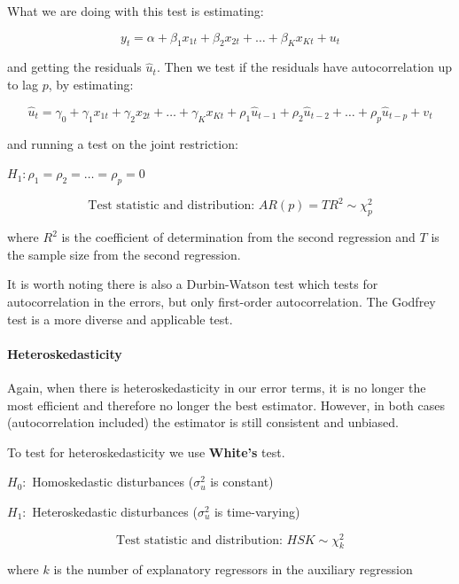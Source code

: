 \documentclass[11pt]{article}
\begin{document}
What we are doing with this test is estimating:

\begin{equation}
y_t=\alpha+\beta_1 x_{1 t}+\beta_2 x_{2 t}+\ldots+\beta_K x_{K t}+u_t
\end{equation}

and getting the residuals $\hat{u}_t$. Then we test if the residuals have autocorrelation up to lag $p$, by estimating:

\begin{equation}
\hat{u}_t=\gamma_0+\gamma_1 x_{1 t}+\gamma_2 x_{2 t}+\ldots+\gamma_K x_{K t}+\rho_1 \hat{u}_{t-1}+\rho_2 \hat{u}_{t-2}+\ldots+\rho_p \hat{u}_{t-p}+v_t
\end{equation}

and running a test on the joint restriction:

$H_1: \rho_1=\rho_2=\ldots=\rho_p=0$

\[\text{Test statistic and distribution: } AR(p) = TR^2 \sim \chi_p^2\]

where $R^2$ is the coefficient of determination from the second regression and $T$ is the sample size from the second regression.

It is worth noting there is also a Durbin-Watson test which tests for autocorrelation in the errors, but only first-order autocorrelation. The Godfrey test is a more diverse and applicable test.

\paragraph{Heteroskedasticity} \mbox{}

Again, when there is heteroskedasticity in our error terms, it is no longer the most efficient and therefore no longer the best estimator. However, in both cases (autocorrelation included) the estimator is still consistent and unbiased.

To test for heteroskedasticity we use \textbf{White's} test.

\begin{mdframed}
    $H_0:$ Homoskedastic disturbances ($\sigma_u^2$ is constant)

    $H_1:$ Heteroskedastic disturbances ($\sigma_u^2$ is time-varying)

    \[\text{Test statistic and distribution: } HSK \sim \chi_k^2\]

    where $k$ is the number of explanatory regressors in the auxiliary regression
\end{mdframed}
\end{document}
